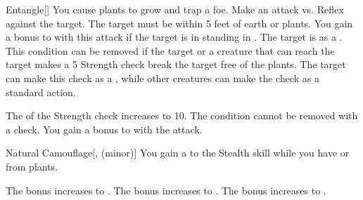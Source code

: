 \lowercase{\hypertarget{spell:Entangle}{}}\label{spell:Entangle}
\begin{freeability}[Rank 1]{\hypertarget{spell:Entangle}{Entangle}}[]
You cause plants to grow and trap a foe.
Make an attack vs. Reflex against the target.
The target must be within 5 feet of earth or plants.
You gain a  bonus to  with this attack if the target is in standing in .
\hit The target is  as a .
This condition can be removed if the target or a creature that can reach the target makes a  5 Strength check break the target free of the plants.
The target can make this check as a , while other creatures can make the check as a standard action.

\rankline
{} The  of the Strength check increases to 10.
 The condition cannot be removed with a check.
 You gain a  bonus to  with the attack.
\end{freeability}
\vspace{0.25em}



\lowercase{\hypertarget{spell:Natural Camouflage}{}}\label{spell:Natural Camouflage}
\begin{freeability}[Rank 1]{\hypertarget{spell:Natural Camouflage}{Natural Camouflage}}[,  (minor)]
You gain a   to the Stealth skill while you have  or  from plants.

\rankline
{} The bonus increases to .
 The bonus increases to .
 The bonus increases to .
\end{freeability}
\vspace{0.25em}




